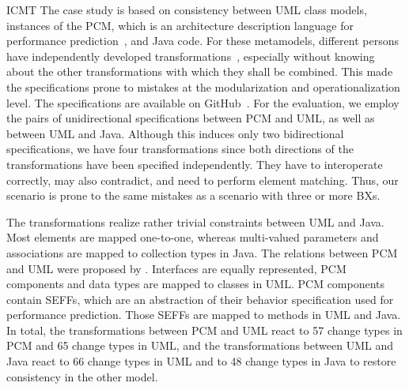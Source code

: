 \begin{copiedFrom}{ICMT}
The case study is based on consistency between UML class models, instances of the \ac{PCM}, which is an architecture description language for performance prediction~\cite{reussner2016b}, and Java code.
For these metamodels, different persons have independently developed transformations~\cite{kramer2017a}, especially without knowing about the other transformations with which they shall be combined.
This made the specifications prone to mistakes at the modularization and operationalization level.
The specifications are available on GitHub~\cite{vitruvCBSEGithub}.
For the evaluation, we employ the pairs of unidirectional specifications between \ac{PCM} and UML, as well as between UML and Java.
Although this induces only two bidirectional specifications, we have four transformations since both directions of the transformations have been specified independently.
They have to interoperate correctly, may also contradict, and need to perform element matching.
Thus, our scenario is prone to the same mistakes as a scenario with three or more \acp{BX}.

The transformations realize rather trivial constraints between UML and Java.
Most elements are mapped one-to-one, whereas multi-valued parameters and associations are mapped to collection types in Java.
The relations between \ac{PCM} and UML were proposed by \textcite{langhammer2015a}.
Interfaces are equally represented, \ac{PCM} components and data types are mapped to classes in UML.
\ac{PCM} components contain \acp{SEFF}, which are an abstraction of their behavior specification used for performance prediction. 
Those \acp{SEFF} are mapped to methods in UML and Java.
In total, the transformations between \ac{PCM} and UML react to 57 change types in \ac{PCM} and 65 change types in UML, and the transformations between UML and Java react to 66 change types in UML and to 48 change types in Java to restore consistency in the other model.


\end{copiedFrom}
